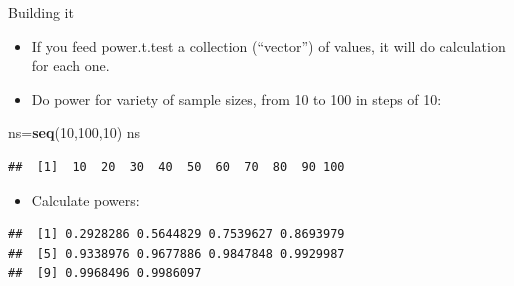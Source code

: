 \documentclass[ignorenonframetext,]{beamer}
\newenvironment{Shaded}{\begin{snugshade}}{\end{snugshade}}
\newcommand{\DataTypeTok}[1]{\textcolor[rgb]{0.13,0.29,0.53}{#1}}
\newcommand{\DecValTok}[1]{\textcolor[rgb]{0.00,0.00,0.81}{#1}}
\newcommand{\KeywordTok}[1]{\textcolor[rgb]{0.13,0.29,0.53}{\textbf{#1}}}
\newcommand{\NormalTok}[1]{#1}
\newcommand{\OperatorTok}[1]{\textcolor[rgb]{0.81,0.36,0.00}{\textbf{#1}}}
\newcommand{\StringTok}[1]{\textcolor[rgb]{0.31,0.60,0.02}{#1}}
\providecommand{\tightlist}{%
  \setlength{\itemsep}{0pt}\setlength{\parskip}{0pt}}
\begin{document}
\begin{frame}[fragile]{Building it}
\protect\hypertarget{building-it}{}

\begin{itemize}
\tightlist
\item
  If you feed power.t.test a collection (``vector'') of values, it will
  do calculation for each one.
\item
  Do power for variety of sample sizes, from 10 to 100 in steps of 10:
\end{itemize}

\begin{Shaded}
\begin{Highlighting}[]
\NormalTok{ns=}\KeywordTok{seq}\NormalTok{(}\DecValTok{10}\NormalTok{,}\DecValTok{100}\NormalTok{,}\DecValTok{10}\NormalTok{)}
\NormalTok{ns}
\end{Highlighting}
\end{Shaded}

\begin{verbatim}
##  [1]  10  20  30  40  50  60  70  80  90 100
\end{verbatim}

\begin{itemize}
\tightlist
\item
  Calculate powers:
\end{itemize}

\begin{Shaded}
\end{Shaded}

\begin{verbatim}
##  [1] 0.2928286 0.5644829 0.7539627 0.8693979
##  [5] 0.9338976 0.9677886 0.9847848 0.9929987
##  [9] 0.9968496 0.9986097
\end{verbatim}

\end{frame}
\end{document}
